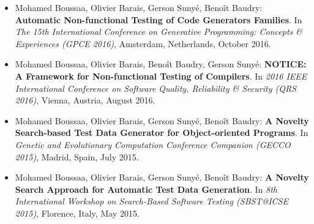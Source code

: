 \begin{itemize}
	
	\item Mohamed Boussaa, Olivier Barais, Gerson Suny\'e, Beno\^it Baudry:
	\textbf{Automatic Non-functional Testing of Code Generators Families}. In
	\textit{The 15th International Conference on Generative Programming: Concepts \& Experiences (GPCE 2016)},
	Amsterdam, Netherlands, October 2016.

	\item Mohamed Boussaa, Olivier Barais, Beno\^it Baudry, Gerson Suny\'e:
	\textbf{NOTICE: A Framework for Non-functional Testing of Compilers}. In 
	\textit{2016 IEEE International Conference on Software Quality, Reliability \& Security (QRS 2016)}, Vienna, Austria, August 2016.
	
	\item Mohamed Boussaa, Olivier Barais, Gerson Suny\'e, Beno\^it Baudry:
	\textbf{A Novelty Search-based Test Data Generator for Object-oriented Programs}. In 
	\textit{Genetic and Evolutionary Computation Conference Companion (GECCO 2015)}, 
	Madrid, Spain, July 2015.
	
	\item Mohamed Boussaa, Olivier Barais, Gerson Suny\'e, Beno\^it Baudry:
	\textbf{A Novelty Search Approach for Automatic Test Data Generation}. In
	\textit{8th International Workshop on Search-Based Software Testing (SBST@ICSE 2015)}, 
	Florence, Italy, May 2015.

	
	
\end{itemize}


